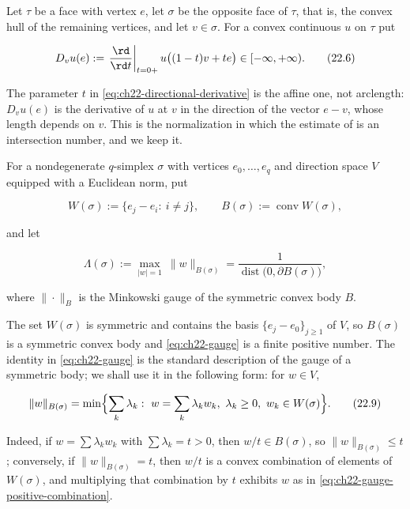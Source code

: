 \begin{definition}
\label{def:ch22-directional-derivative}
Let \(\tau\) be a face with vertex \(e\), let \(\sigma\) be the opposite
face of \(\tau\), that is, the convex hull of the remaining vertices, and
let \(v\in\sigma\).  For a convex continuous \(u\) on \(\tau\) put

\[
 D_v u(e)
   :=\left.\frac{\rd}{\rd t}\right|_{t=0+}
      u\bigl((1-t)v+te\bigr)\in[-\infty,+\infty).
\tag{22.6}\label{eq:ch22-directional-derivative}
\]
\end{definition}

The parameter \(t\) in \eqref{eq:ch22-directional-derivative} is the affine
one, not arclength: \(D_vu(e)\) is the derivative of \(u\) at \(v\) in the
direction of the vector \(e-v\), whose length depends on \(v\).  This is the
normalization in which the estimate of  is an
intersection number, and we keep it.

\begin{definition}
\label{def:ch22-simplex-gauge}
For a nondegenerate \(q\)-simplex \(\sigma\) with vertices
\(e_0,\ldots,e_q\) and direction space \(V\) equipped with a Euclidean norm,
put

\[
 W(\sigma):=\{e_j-e_i:\ i\neq j\},
 \qquad
 B(\sigma):=\operatorname{conv}W(\sigma),
\tag{22.7}\label{eq:ch22-gauge-body}
\]

and let

\[
 \Lambda(\sigma)
   :=\max_{|w|=1}\ \|w\|_{B(\sigma)}
   =\frac1{\operatorname{dist}\bigl(0,\partial B(\sigma)\bigr)},
\tag{22.8}\label{eq:ch22-gauge}
\]

where \(\|\cdot\|_{B}\) is the Minkowski gauge of the symmetric convex body
\(B\).
\end{definition}

The set \(W(\sigma)\) is symmetric and contains the basis
\(\{e_j-e_0\}_{j\geq1}\) of \(V\), so \(B(\sigma)\) is a symmetric convex
body and \eqref{eq:ch22-gauge} is a finite positive number.  The identity in
\eqref{eq:ch22-gauge} is the standard description of the gauge of a
symmetric body; we shall use it in the following form: for \(w\in V\),

\[
 \|w\|_{B(\sigma)}
 =\min\Bigl\{\sum_k\lambda_k:\ w=\sum_k\lambda_kw_k,\
       \lambda_k\geq0,\ w_k\in W(\sigma)\Bigr\}.
\tag{22.9}\label{eq:ch22-gauge-positive-combination}
\]

Indeed, if \(w=\sum\lambda_kw_k\) with \(\sum\lambda_k=t>0\), then
\(w/t\in B(\sigma)\), so \(\|w\|_{B(\sigma)}\leq t\); conversely, if
\(\|w\|_{B(\sigma)}=t\), then \(w/t\) is a convex combination of elements of
\(W(\sigma)\), and multiplying that combination by \(t\) exhibits \(w\) as
in \eqref{eq:ch22-gauge-positive-combination}.

